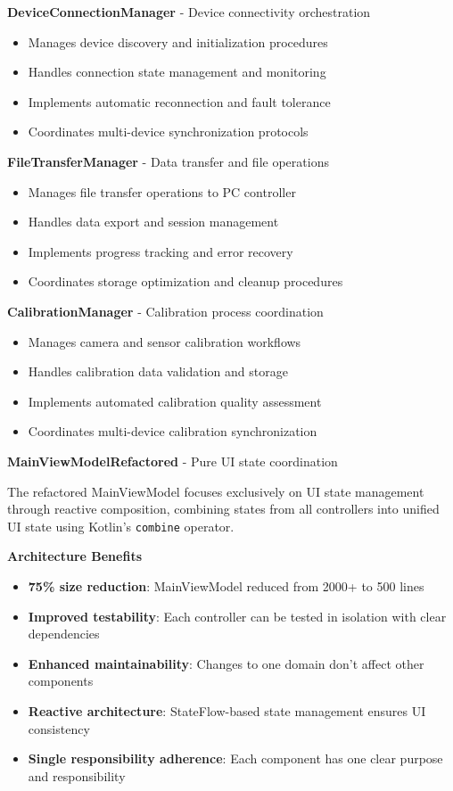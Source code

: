\documentclass[12pt,a4paper]{report}
\begin{document}
\textbf{DeviceConnectionManager} - Device connectivity orchestration
\begin{itemize}
\item Manages device discovery and initialization procedures
\item Handles connection state management and monitoring
\item Implements automatic reconnection and fault tolerance
\item Coordinates multi-device synchronization protocols
\end{itemize}

\textbf{FileTransferManager} - Data transfer and file operations
\begin{itemize}
\item Manages file transfer operations to PC controller
\item Handles data export and session management
\item Implements progress tracking and error recovery
\item Coordinates storage optimization and cleanup procedures
\end{itemize}

\textbf{CalibrationManager} - Calibration process coordination
\begin{itemize}
\item Manages camera and sensor calibration workflows
\item Handles calibration data validation and storage
\item Implements automated calibration quality assessment
\item Coordinates multi-device calibration synchronization
\end{itemize}

\textbf{MainViewModelRefactored} - Pure UI state coordination

The refactored MainViewModel focuses exclusively on UI state management through reactive composition, combining states from all controllers into unified UI state using Kotlin's \texttt{combine} operator.

\textbf{Architecture Benefits}
\begin{itemize}
\item \textbf{75\% size reduction}: MainViewModel reduced from 2000+ to 500 lines
\item \textbf{Improved testability}: Each controller can be tested in isolation with clear dependencies
\item \textbf{Enhanced maintainability}: Changes to one domain don't affect other components
\item \textbf{Reactive architecture}: StateFlow-based state management ensures UI consistency
\item \textbf{Single responsibility adherence}: Each component has one clear purpose and responsibility
\end{itemize}
\end{document}
